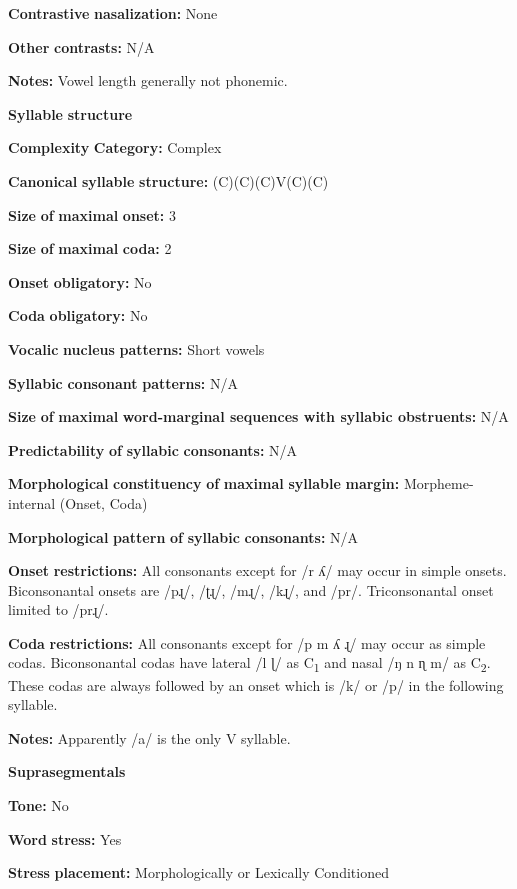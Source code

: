 \begin{styleBody}
\textbf{Contrastive} \textbf{nasalization:} None

\textbf{Other} \textbf{contrasts:} N/A

\textbf{Notes:} Vowel length generally not phonemic.

\textbf{Syllable} \textbf{structure}

\textbf{Complexity} \textbf{Category:} Complex

\textbf{Canonical} \textbf{syllable} \textbf{structure:} (C)(C)(C)V(C)(C) \citep[23-6]{Rumsey1978}

\textbf{Size} \textbf{of} \textbf{maximal} \textbf{onset:} 3

\textbf{Size} \textbf{of} \textbf{maximal} \textbf{coda:} 2

\textbf{Onset} \textbf{obligatory:} No

\textbf{Coda} \textbf{obligatory:} No

\textbf{Vocalic} \textbf{nucleus} \textbf{patterns:} Short vowels

\textbf{Syllabic} \textbf{consonant} \textbf{patterns:} N/A

\textbf{Size} \textbf{of} \textbf{maximal} \textbf{word{}-marginal sequences with syllabic obstruents:} N/A

\textbf{Predictability} \textbf{of} \textbf{syllabic} \textbf{consonants:} N/A

\textbf{Morphological} \textbf{constituency} \textbf{of} \textbf{maximal} \textbf{syllable} \textbf{margin:} Morpheme-internal (Onset, Coda)

\textbf{Morphological} \textbf{pattern} \textbf{of} \textbf{syllabic} \textbf{consonants:} N/A

\textbf{Onset} \textbf{restrictions:} All consonants except for /r ʎ/ may occur in simple onsets. Biconsonantal onsets are /pɻ/, /ʈɻ/, /mɻ/, /kɻ/, and /pr/. Triconsonantal onset limited to /prɻ/.

\textbf{Coda} \textbf{restrictions:} All consonants except for /p m ʎ ɻ/ may occur as simple codas. Biconsonantal codas have lateral /l ɭ/ as C\textsubscript{1} and nasal /ŋ n ɳ m/ as C\textsubscript{2}. These codas are always followed by an onset which is /k/ or /p/ in the following syllable.

\textbf{Notes:} Apparently /a/ is the only V syllable.

\textbf{Suprasegmentals}

\textbf{Tone:} No

\textbf{Word} \textbf{stress:} Yes

\textbf{Stress} \textbf{placement:} Morphologically or Lexically Conditioned


\end{styleBody}
